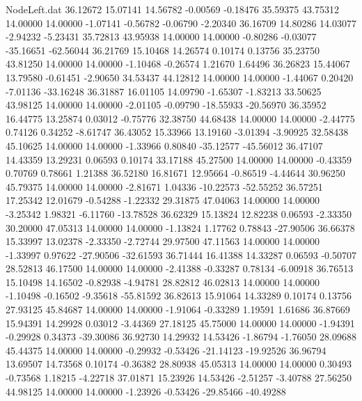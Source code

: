 \begin{filecontents}{NodeLeft.dat}
  36.12672   15.07141   14.56782    -0.00569   -0.18476   35.59375   43.75312   14.00000   14.00000   -1.07141   -0.56782   -0.06790   -2.20340
  36.16709   14.80286   14.03077    -2.94232   -5.23431   35.72813   43.95938   14.00000   14.00000   -0.80286   -0.03077  -35.16651  -62.56044
  36.21769   15.10468   14.26574     0.10174    0.13756   35.23750   43.81250   14.00000   14.00000   -1.10468   -0.26574    1.21670    1.64496
  36.26823   15.44067   13.79580    -0.61451   -2.90650   34.53437   44.12812   14.00000   14.00000   -1.44067    0.20420   -7.01136  -33.16248
  36.31887   16.01105   14.09790    -1.65307   -1.83213   33.50625   43.98125   14.00000   14.00000   -2.01105   -0.09790  -18.55933  -20.56970
  36.35952   16.44775   13.25874     0.03012   -0.75776   32.38750   44.68438   14.00000   14.00000   -2.44775    0.74126    0.34252   -8.61747
  36.43052   15.33966   13.19160    -3.01394   -3.90925   32.58438   45.10625   14.00000   14.00000   -1.33966    0.80840  -35.12577  -45.56012
  36.47107   14.43359   13.29231     0.06593    0.10174   33.17188   45.27500   14.00000   14.00000   -0.43359    0.70769    0.78661    1.21388
  36.52180   16.81671   12.95664    -0.86519   -4.44644   30.96250   45.79375   14.00000   14.00000   -2.81671    1.04336  -10.22573  -52.55252
  36.57251   17.25342   12.01679    -0.54288   -1.22332   29.31875   47.04063   14.00000   14.00000   -3.25342    1.98321   -6.11760  -13.78528
  36.62329   15.13824   12.82238     0.06593   -2.33350   30.20000   47.05313   14.00000   14.00000   -1.13824    1.17762    0.78843  -27.90506
  36.66378   15.33997   13.02378    -2.33350   -2.72744   29.97500   47.11563   14.00000   14.00000   -1.33997    0.97622  -27.90506  -32.61593
  36.71444   16.41388   14.33287     0.06593   -0.50707   28.52813   46.17500   14.00000   14.00000   -2.41388   -0.33287    0.78134   -6.00918
  36.76513   15.10498   14.16502    -0.82938   -4.94781   28.82812   46.02813   14.00000   14.00000   -1.10498   -0.16502   -9.35618  -55.81592
  36.82613   15.91064   14.33289     0.10174    0.13756   27.93125   45.84687   14.00000   14.00000   -1.91064   -0.33289    1.19591    1.61686
  36.87669   15.94391   14.29928     0.03012   -3.44369   27.18125   45.75000   14.00000   14.00000   -1.94391   -0.29928    0.34373  -39.30086
  36.92730   14.29932   14.53426    -1.86794   -1.76050   28.09688   45.44375   14.00000   14.00000   -0.29932   -0.53426  -21.14123  -19.92526
  36.96794   13.69507   14.73568     0.10174   -0.36382   28.80938   45.05313   14.00000   14.00000    0.30493   -0.73568    1.18215   -4.22718
  37.01871   15.23926   14.53426    -2.51257   -3.40788   27.56250   44.98125   14.00000   14.00000   -1.23926   -0.53426  -29.85466  -40.49288

\end{filecontents}
